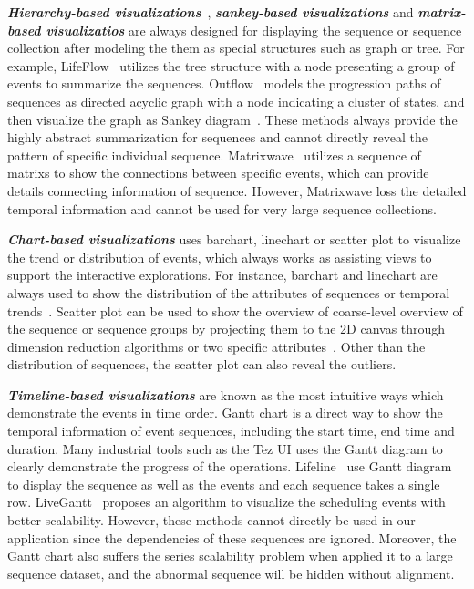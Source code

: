 \emph{\textbf{Hierarchy-based visualizations}}~\cite{gotz2019visual}, \emph{\textbf{sankey-based visualizations}} and \emph{\textbf{matrix-based visualizatios}} are always designed for displaying the sequence or sequence collection after modeling the them as special structures such as graph or tree.
For example, LifeFlow~\cite{wongsuphasawat2011lifeflow} utilizes the tree structure with a node presenting a group of events to summarize the sequences. Outflow~\cite{wongsuphasawat2011outflow} models the progression paths of sequences as directed acyclic graph with a node indicating a cluster of states, and then visualize the graph as Sankey diagram~\cite{riehmann2005interactive}.  These methods always provide the highly abstract summarization for sequences and cannot directly reveal the pattern of specific individual sequence. Matrixwave~\cite{zhao2015matrixwave} utilizes a sequence of matrixs to show the connections between specific events, which can provide details connecting information of sequence. However, Matrixwave loss the detailed temporal information and cannot be used for very large sequence collections. 

\emph{\textbf{Chart-based visualizations}} uses barchart, linechart or scatter plot to visualize the trend or distribution of events, which always works as assisting views to support the interactive explorations. For instance, barchart and linechart are always used to show the distribution of the attributes of sequences or temporal trends~\cite{gotz2019visual, cappers2017exploring}. Scatter plot can be used to show the overview of coarse-level overview of the sequence or sequence groups by projecting them to the 2D canvas through dimension reduction algorithms or two specific attributes~\cite{wu2020visual, malik2016high, gotz2019visual}. Other than the distribution of sequences, the scatter plot can also reveal the outliers. 

\emph{\textbf{Timeline-based visualizations}} are known as the most intuitive ways which demonstrate the events in time order. Gantt chart is a direct way to show the temporal information of event sequences, including the start time, end time and duration. Many industrial tools such as the Tez UI uses the Gantt diagram to clearly demonstrate the progress of the operations. Lifeline~\cite{plaisant1996lifelines} use Gantt diagram to display the sequence as well as the events and each sequence takes a single row. LiveGantt~\cite{jo2014livegantt} proposes an algorithm to visualize the scheduling events with better scalability. However, these methods cannot directly be used in our application since the dependencies of these sequences are ignored. Moreover, the Gantt chart also suffers the series scalability problem when applied it to a large sequence dataset, and the abnormal sequence will be hidden without alignment.
